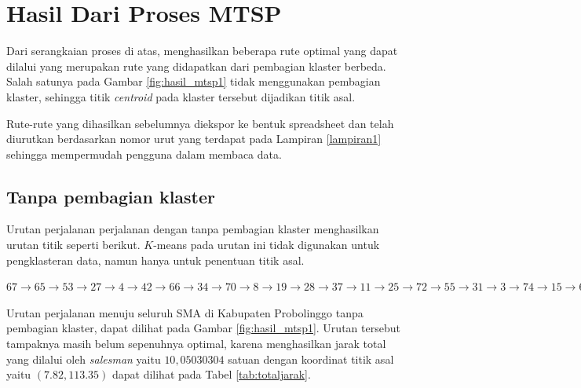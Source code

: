 \section{Hasil Dari Proses MTSP}

Dari serangkaian proses di atas, menghasilkan beberapa rute optimal yang dapat dilalui yang merupakan rute yang didapatkan dari pembagian klaster berbeda. Salah satunya pada Gambar \ref{fig:hasil_mtsp1} tidak menggunakan pembagian klaster, sehingga titik \textit{centroid} pada klaster tersebut dijadikan titik asal.

Rute-rute yang dihasilkan sebelumnya diekspor ke bentuk spreadsheet dan telah diurutkan berdasarkan nomor urut yang terdapat pada Lampiran \ref{lampiran1} sehingga mempermudah pengguna dalam membaca data.

\subsection{Tanpa pembagian klaster}

Urutan perjalanan perjalanan dengan tanpa pembagian klaster menghasilkan urutan titik seperti berikut. $K$-means pada urutan ini tidak digunakan untuk pengklasteran data, namun hanya untuk penentuan titik asal.

$67\rightarrow65\rightarrow53\rightarrow27\rightarrow4\rightarrow42\rightarrow66\rightarrow34\rightarrow70\rightarrow8\rightarrow19\rightarrow28\rightarrow37\rightarrow11\rightarrow25\rightarrow72\rightarrow55\rightarrow31\rightarrow3\rightarrow74\rightarrow15\rightarrow68\rightarrow20\rightarrow44\rightarrow40\rightarrow16\rightarrow30\rightarrow23\rightarrow24\rightarrow63\rightarrow13\rightarrow29\rightarrow50\rightarrow7\rightarrow54\rightarrow2\rightarrow10\rightarrow52\rightarrow64\rightarrow21\rightarrow62\rightarrow58\rightarrow26\rightarrow1\rightarrow69\rightarrow14\rightarrow45\rightarrow61\rightarrow38\rightarrow59\rightarrow17\rightarrow71\rightarrow18\rightarrow32\rightarrow57\rightarrow73\rightarrow75\rightarrow41\rightarrow39\rightarrow49\rightarrow51\rightarrow6\rightarrow60\rightarrow22\rightarrow33\rightarrow48\rightarrow5\rightarrow35\rightarrow46\rightarrow56\rightarrow36\rightarrow47\rightarrow9\rightarrow12\rightarrow43$

Urutan perjalanan menuju seluruh SMA di Kabupaten Probolinggo tanpa pembagian klaster, dapat dilihat pada Gambar \ref{fig:hasil_mtsp1}. Urutan tersebut tampaknya masih belum sepenuhnya optimal, karena menghasilkan jarak total yang dilalui oleh \textit{salesman} yaitu $10,05030304$ satuan dengan koordinat titik asal yaitu $(7.82, 113.35)$ dapat dilihat pada Tabel \ref{tab:totaljarak}.

